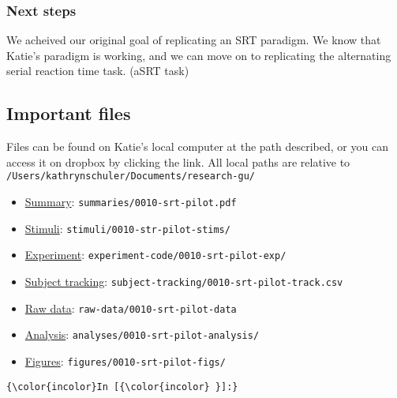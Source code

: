 \documentclass[11pt]{article}
\providecommand{\tightlist}{%
      \setlength{\itemsep}{0pt}\setlength{\parskip}{0pt}}
\begin{document}
    

    \subsubsection{Next steps}\label{next-steps}

We acheived our original goal of replicating an SRT paradigm. We know
that Katie's paradigm is working, and we can move on to replicating the
alternating serial reaction time task. (aSRT task)

    \subsection{Important files}\label{important-files}

Files can be found on Katie's local computer at the path described, or
you can access it on dropbox by clicking the link. All local paths are
relative to \texttt{/Users/kathrynschuler/Documents/research-gu/}

\begin{itemize}
\tightlist
\item
  \href{}{Summary}: \texttt{summaries/0010-srt-pilot.pdf}
\item
  \href{https://www.dropbox.com/sh/zfs3kwopxgktvff/AAA665qHEAr6Rp4DEB4nMH9ga?dl=0}{Stimuli}:
  \texttt{stimuli/0010-str-pilot-stims/}
\item
  \href{https://www.dropbox.com/sh/3zrqr371ldw5gu0/AAAjxrHccjPTZ-Re_0dZD-SGa?dl=0}{Experiment}:
  \texttt{experiment-code/0010-srt-pilot-exp/}
\item
  \href{https://www.dropbox.com/s/lak50vpz35yx5he/0010-SRT-pilot-track.csv?dl=0}{Subject
  tracking}: \texttt{subject-tracking/0010-srt-pilot-track.csv}
\item
  \href{https://www.dropbox.com/sh/m1ixi64n28j4k8t/AADeh5hFw25EvvfVMtOxZhwRa?dl=0}{Raw
  data}: \texttt{raw-data/0010-srt-pilot-data}
\item
  \href{https://www.dropbox.com/sh/8m5td0y7w39ox6j/AACp3fAxtvg9v1_WyPpNe7MCa?dl=0}{Analysis}:
  \texttt{analyses/0010-srt-pilot-analysis/}
\item
  \href{https://www.dropbox.com/sh/ex3ma6g4u124bi7/AACZct7dUlb4hfPqruhaoa1oa?dl=0}{Figures}:
  \texttt{figures/0010-srt-pilot-figs/}
\end{itemize}

    \begin{Verbatim}[commandchars=\\\{\}]
{\color{incolor}In [{\color{incolor} }]:} 
\end{Verbatim}


    
    
    
    
\end{document}
